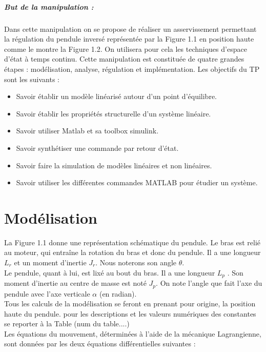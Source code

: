 \documentclass[12pt, a4paper, openany]{report}
\begin{document}
\paragraph{But de la manipulation :}  Dans cette manipulation on se propose de réaliser un asservissement permettant la régulation du pendule inversé représentée par la Figure 1.1 en position haute comme le montre la Figure 1.2. On utilisera pour cela les techniques d'espace d'état à temps continu. Cette manipulation est constituée de quatre grandes étapes : modélisation, analyse, régulation et implémentation. Les objectifs du TP sont les suivants :
\begin{itemize}
\item Savoir établir un modèle linéarisé autour d'un point d'équilibre.
\item Savoir établir les propriétés structurelle d'un système linéaire.
\item Savoir utiliser Matlab et sa toolbox simulink.
\item Savoir synthétiser une commande par retour d'état.
\item Savoir faire la simulation de modèles linéaires et non linéaires.
\item Savoir utiliser les différentes commandes MATLAB pour étudier un système.

\end{itemize}

    
 \chapter{Modélisation}
 
 La Figure 1.1 donne une représentation schématique du pendule. Le bras est relié au moteur, qui entraîne la rotation du bras et donc du pendule. Il a une longueur $L_{r}$ et un moment d'inertie $J_{r}$. Nous noterons son angle $\theta$.\\
 Le pendule, quant à lui, est lixé au bout du bras. Il a une longueur $L_{p}$ . Son moment d'inertie au
centre de masse est noté $J_{p}$. On note l'angle que fait l'axe du pendule avec l'axe verticale $\alpha$ (en radian).\\
 Tous les calculs de la modélisation se feront en prenant pour origine, la position haute du pendule. pour les descriptions et les valeurs numériques des constantes se reporter à la Table (num du table....) \\
 Les équations du mouvement, déterminées à l'aide de la mécanique Lagrangienne, sont données par les
deux équations différentielles suivantes : \\[1cm]\\
\end{document}
